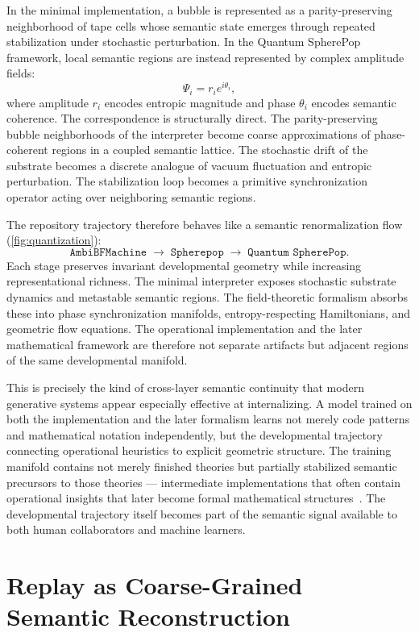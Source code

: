 \documentclass[12pt]{article}
\begin{document}
In the minimal implementation, a bubble is represented as a parity-preserving
neighborhood of tape cells whose semantic state emerges through repeated
stabilization under stochastic perturbation. In the Quantum SpherePop
framework, local semantic regions are instead represented by complex amplitude
fields:
\[
\Psi_i = r_i e^{i\theta_i},
\]
where amplitude $r_i$ encodes entropic magnitude and phase $\theta_i$ encodes
semantic coherence. The correspondence is structurally direct. The
parity-preserving bubble neighborhoods of the interpreter become coarse
approximations of phase-coherent regions in a coupled semantic lattice. The
stochastic drift of the substrate becomes a discrete analogue of vacuum
fluctuation and entropic perturbation. The stabilization loop becomes a
primitive synchronization operator acting over neighboring semantic regions.

The repository trajectory therefore behaves like a semantic renormalization
flow (\cref{fig:quantization}):
\[
\texttt{AmbiBFMachine}
\;\longrightarrow\;
\texttt{Spherepop}
\;\longrightarrow\;
\texttt{Quantum SpherePop}.
\]
Each stage preserves invariant developmental geometry while increasing
representational richness. The minimal interpreter exposes stochastic substrate
dynamics and metastable semantic regions. The field-theoretic formalism absorbs
these into phase synchronization manifolds, entropy-respecting Hamiltonians,
and geometric flow equations. The operational implementation and the later
mathematical framework are therefore not separate artifacts but adjacent regions
of the same developmental manifold.

This is precisely the kind of cross-layer semantic continuity that modern
generative systems appear especially effective at internalizing. A model trained
on both the implementation and the later formalism learns not merely code
patterns and mathematical notation independently, but the developmental
trajectory connecting operational heuristics to explicit geometric structure.
The training manifold contains not merely finished theories but partially
stabilized semantic precursors to those theories --- intermediate implementations
that often contain operational insights that later become formal mathematical
structures~\cite{goodfellow2016,vaswani2017}. The developmental trajectory
itself becomes part of the semantic signal available to both human collaborators
and machine learners.

\section{Replay as Coarse-Grained Semantic Reconstruction}
\end{document}
